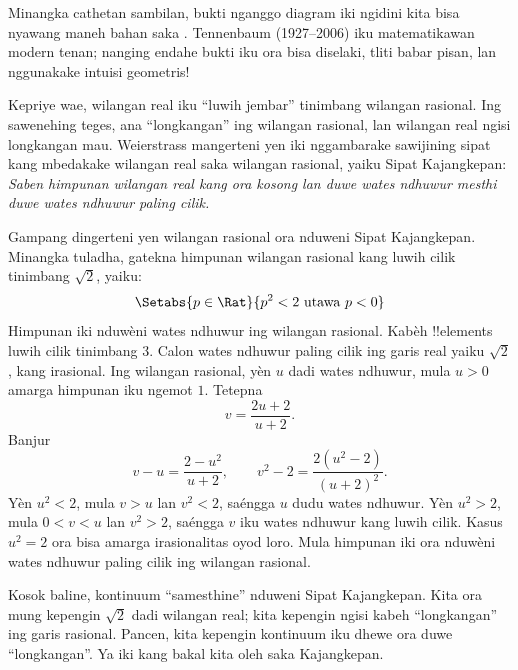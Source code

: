 \documentclass[../../../include/open-logic-section]{subfiles}
\begin{document}
Minangka cathetan sambilan, bukti nganggo diagram iki ngidini kita
bisa nyawang maneh bahan saka .
Tennenbaum (1927--2006) iku matematikawan modern tenan; nanging endahe
bukti iku ora bisa diselaki, tliti babar pisan, lan nggunakake intuisi geometris!

Kepriye wae, wilangan real iku ``luwih jembar'' tinimbang wilangan
rasional. Ing sawenehing teges, ana ``longkangan'' ing wilangan rasional,
lan wilangan real ngisi longkangan mau. Weierstrass mangerteni yen iki
nggambarake sawijining sipat kang mbedakake wilangan real saka wilangan
rasional, yaiku Sipat Kajangkepan: \emph{Saben himpunan wilangan real kang
ora kosong lan duwe wates ndhuwur mesthi duwe wates ndhuwur paling cilik.}

Gampang dingerteni yen wilangan rasional ora nduweni Sipat Kajangkepan.
Minangka tuladha, gatekna himpunan wilangan rasional kang luwih cilik
tinimbang $\sqrt{2}$, yaiku:
\[
	\Setabs{p \in \Rat}{p^2 < 2 \text{ utawa }p < 0}
\]
Himpunan iki nduwèni wates ndhuwur ing wilangan rasional.
Kabèh !!{element}s luwih cilik tinimbang $3$. Calon wates ndhuwur paling
cilik ing garis real yaiku $\sqrt{2}$, kang irasional.
Ing wilangan rasional, yèn $u$ dadi wates ndhuwur, mula $u>0$ amarga
himpunan iku ngemot $1$. Tetepna
\[
  v=\frac{2u+2}{u+2}.
\]
Banjur
\[
 v-u=\frac{2-u^2}{u+2},\qquad v^2-2=\frac{2(u^2-2)}{(u+2)^2}.
\]
Yèn $u^2<2$, mula $v>u$ lan $v^2<2$, saéngga $u$ dudu wates ndhuwur.
Yèn $u^2>2$, mula $0<v<u$ lan $v^2>2$, saéngga $v$ iku wates ndhuwur
kang luwih cilik. Kasus $u^2=2$ ora bisa amarga irasionalitas oyod loro.
Mula himpunan iki ora nduwèni wates ndhuwur paling cilik ing wilangan rasional.

Kosok baline, kontinuum ``samesthine'' nduweni Sipat Kajangkepan. Kita ora mung
kepengin $\sqrt{2}$ dadi wilangan real; kita kepengin ngisi kabeh
``longkangan'' ing garis rasional. Pancen, kita kepengin kontinuum iku
dhewe ora duwe ``longkangan''. Ya iki kang bakal kita oleh saka Kajangkepan.
\end{document}
